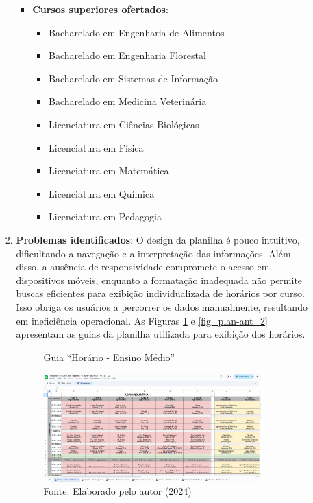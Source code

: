 \begin{itemize}
\begin{itemize}
\begin{enumerate}
\begin{itemize}
                \item \textbf{Cursos superiores ofertados}:
                \begin{itemize}
                    \item Bacharelado em Engenharia de Alimentos
                    \item Bacharelado em Engenharia Florestal
                    \item Bacharelado em Sistemas de Informação
                    \item Bacharelado em Medicina Veterinária
                    \item Licenciatura em Ciências Biológicas
                    \item Licenciatura em Física
                    \item Licenciatura em Matemática
                    \item Licenciatura em Química
                    \item Licenciatura em Pedagogia
                \end{itemize}
            \end{itemize}
            \item \textbf{Problemas identificados}: O design da planilha é pouco intuitivo, dificultando a navegação e a interpretação das informações. Além disso, a ausência de responsividade compromete o acesso em dispositivos móveis, enquanto a formatação inadequada não permite buscas eficientes para exibição individualizada de horários por curso. Isso obriga os usuários a percorrer os dados manualmente, resultando em ineficiência operacional. As Figuras \ref{fig_plan-ant_1} e \ref{fig_plan-ant_2} apresentam as guias da planilha utilizada para exibição dos horários.

            \begin{figure}[htb]
                \centering
                \caption{Guia ``Horário - Ensino Médio''}
                \includegraphics[width=0.9\textwidth]{Figuras/plan-ant-1.png}
                \caption*{Fonte: Elaborado pelo autor (2024)}
                \label{fig_plan-ant_1}
            \end{figure}


\end{enumerate}
\end{itemize}
\end{itemize}
